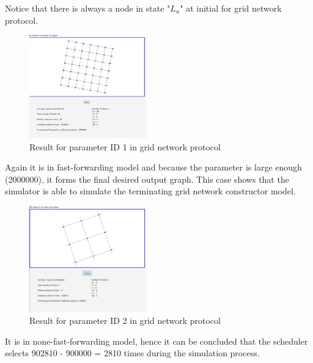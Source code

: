Notice that there is always a node in state "$L_{u}$" at initial for grid network protocol.
\FloatBarrier
\begin{figure}[H]
\begin{center}
\includegraphics[width =0.45\textwidth]{context/diagram/GridNetwork_FastForwarding_Partial.png}
\caption{Result for parameter ID 1 in grid network protocol}
\label{capture_grid_res1}
\end{center}
\end{figure}
\par\noindent
Again it is in fast-forwarding model and because the parameter is large enough (2000000), it forms the final desired output graph.
This case shows that the simulator is able to simulate the terminating grid network constructor model.
\FloatBarrier
\begin{figure}[H]
\begin{center}
\includegraphics[width =0.45\textwidth]{context/diagram/GridNetwork_NoneFastForwarding8_Partial.png}
\caption{Result for parameter ID 2 in grid network protocol}
\label{capture_grid_res2}
\end{center}
\end{figure}
\par\noindent
It is in none-fast-forwarding model, hence it can be concluded that the scheduler selects 902810 - 900000 = 2810 times during the simulation process.
\FloatBarrier
